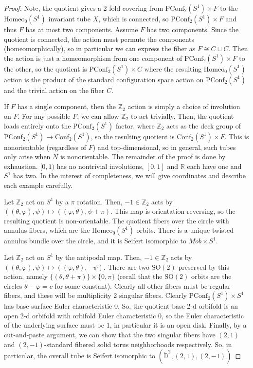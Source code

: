 \documentclass[10pt, oneside]{article}
\newcommand{\Z}{\mathbb{Z}}
\newcommand{\SO}[1][2]{\text{SO}(#1)}
\newcommand{\homeo}[1][S^1]{\text{Homeo}_0(#1)}
\newcommand{\conf}[2][S^1]{\text{Conf}_{#2}(#1)}
\newcommand{\pconf}[2][S^1]{\text{PConf}_{#2}(#1)}
\theoremstyle{definition}
\theoremstyle{definition}
\begin{document}
\begin{proof}
    Note, 
    the quotient gives a 2-fold covering
    from $\pconf{2}\times F$
    to the $\homeo$ invariant tube $X$,
    which is connected,
    so $\pconf{2}\times F$
    and thus $F$ has at most two components.
    Assume $F$ has two components.
    Since the quotient is connected,
    the action must permute the components (homeomorphically),
    so in particular we can express the fiber
    as $F\cong C\sqcup C$.
    Then the action is just a homeomorphism
    from one component of $\pconf{2}\times F$ to the other,
    so the quotient is $\pconf{2}\times C$
    where the resulting $\homeo$ action is the product of the standard configuration space action on $\pconf{2}$ and the trivial action on the fiber $C$.

    If $F$ has a single component,
    then the $\Z_2$ action is simply a choice of involution on $F$. For any possible $F$,
    we can allow $\Z_2$ to act trivially.
    Then,
    the quotient loads entirely
    onto the $\pconf{2}$ factor,
    where $\Z_2$ acts as the deck group of $\pconf{2}\to\conf{2}$,
    so the resulting quotient is $\conf{2}\times F$.
    This is nonorientable (regardless of $F$) and top-dimensional,
    so in general,
    such tubes only arise when $N$ is nonorientable.
    The remainder of the proof is done by exhaustion.
    $[0,1)$ has no nontrivial involutions,
    $[0,1]$ and $\mathbb{R}$ each have one
    and $S^1$ has two. In the interest of completeness, we will give coordinates and describe each example carefully.

    Let $\Z_2$ act on $S^1$ by a $\pi$ rotation. Then, $-1\in\Z_2$ acts by $((\theta, \varphi), \psi) \mapsto ((\varphi, \theta), \psi + \pi)$. This map is orientation-reversing, so the resulting quotient is non-orientable. The quotient fibers over the circle with annulus fibers, which are the $\homeo$ orbits. There is a unique twisted annulus bundle over the circle, and it is Seifert isomorphic to $M\ddot{o}b \times S^1$.

    Let $\Z_2$ act on $S^1$ by the antipodal map. Then, $-1\in\Z_2$\improve{introduce using $\Z_2 =\{-1, 1\}$} acts by $((\theta, \varphi), \psi)\mapsto ((\varphi, \theta), -\psi)$. There are two $\SO$ preserved by this action, namely $\{(\theta, \theta + \pi)\}\times \{0, \pi\}$ (recall that the $\SO$ orbits are the circles $\theta-\varphi = c$ for some constant). Clearly all other fibers must be regular fibers, and these will be multiplicity 2 singular fibers. Clearly $\pconf{2}\times S^1$ has base surface Euler characteristic 0. So, the quotient base 2-d orbifold is an open 2-d orbifold with orbifold Euler characteristic 0, so the Euler characteristic of the underlying surface must be 1, in particular it is an open disk. Finally, by a cut-and-paste argument, we can show that the two singular fibers have $(2, 1)$ and $(2,-1)$-standard fibered solid torus neighborhoods respectively. So, in particular, the overall tube is Seifert isomorphic to $(\mathring{\mathbb{D}}^2, (2, 1), (2,-1))$


\end{proof}
\end{document}
